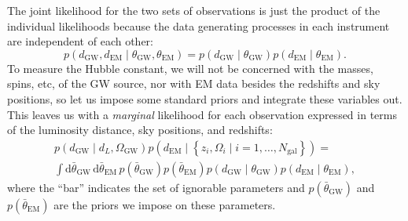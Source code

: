 \documentclass[modern]{aastex62}
\newcommand{\dd}{\mathrm{d}}
\newcommand{\dEM}{d_{\mathrm{EM}}}
\newcommand{\dGW}{d_{\mathrm{GW}}}
\newcommand{\Ngal}{N_{\mathrm{gal}}}
\newcommand{\OGW}{\Omega_{\mathrm{GW}}}
\newcommand{\thetaEM}{\theta_{\mathrm{EM}}}
\newcommand{\thetaGW}{\theta_{\mathrm{GW}}}
\begin{document}
The joint likelihood for the two sets of observations is just the product of the
individual likelihoods because the data generating processes in each instrument
are independent of each other:
%
\begin{equation}
    p\left( \dGW, \dEM \mid \thetaGW, \thetaEM \right) =  p\left( \dGW \mid \thetaGW \right) p\left( \dEM \mid \thetaEM \right).
\end{equation}
%
To measure the Hubble constant, we will not be concerned with the masses, spins,
etc, of the \ac{GW} source, nor with \ac{EM} data besides the redshifts and sky
positions, so let us impose some standard priors and integrate these variables
out.  This leaves us with a \emph{marginal} likelihood for each observation
expressed in terms of the luminosity distance, sky positions, and redshifts:
%
\begin{multline}
    p\left( \dGW \mid d_L, \OGW \right) p\left( \dEM \mid \left\{ z_i, \Omega_i \mid i = 1, \ldots, \Ngal \right\} \right) = \\ \int \dd \bar{\theta}_{\mathrm{GW}} \, \dd \bar{\theta}_{\mathrm{EM}} \, p\left( \bar{\theta}_{\mathrm{GW}} \right) p\left( \bar{\theta}_{\mathrm{EM}} \right) p\left( \dGW \mid \thetaGW \right) p\left( \dEM \mid \thetaEM \right),
\end{multline}
%
where the ``bar'' indicates the set of ignorable parameters and $p\left(
\bar{\theta}_{\mathrm{GW}} \right)$ and $p\left( \bar{\theta}_{\mathrm{EM}}
\right)$ are the priors we impose on these parameters.
\end{document}
